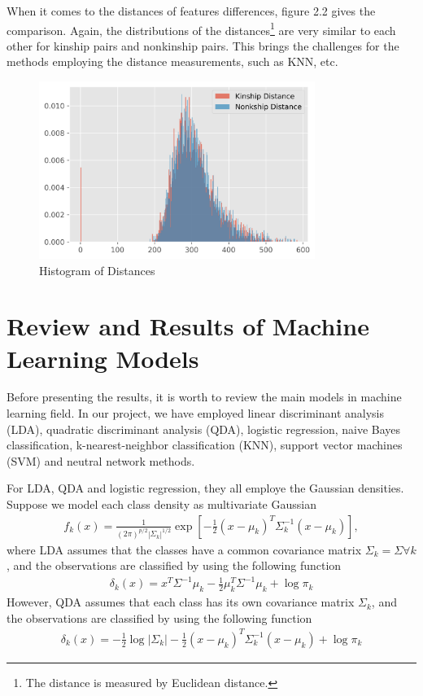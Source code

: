 \documentclass[12pt]{article}
\theoremstyle{definition}
\numberwithin{equation}{section}
\numberwithin{figure}{section}
\numberwithin{table}{section}
\begin{document}
When it comes to the distances of features differences, figure 2.2 gives the comparison. Again, the distributions of the distances\footnote{The distance is measured by Euclidean distance.} are very similar to each other for kinship pairs and nonkinship pairs. This brings the challenges for the methods employing the distance measurements, such as KNN, etc.  
\begin{figure}[!htpb]
	\centering
	\includegraphics[width=0.8\textwidth]{histdistance}
	\caption{Histogram of Distances}
\end{figure}

\section{Review and Results of Machine Learning Models}

Before presenting the results, it is worth to review the main models in machine learning field. In our project, we have employed linear discriminant analysis (LDA), quadratic discriminant analysis (QDA), logistic regression, naive Bayes classification, k-nearest-neighbor classification (KNN), support vector machines (SVM) and neutral network methods. 

For LDA, QDA and logistic regression, they all employe the Gaussian densities. Suppose we model each class density as multivariate Gaussian 
\begin{align}
	f_k(x) = \frac{1}{(2\pi)^{p/2} | \Sigma_k|^{1/2}} \exp[-\frac{1}{2}(x - \mu_k)^T \Sigma_k^{-1}(x-\mu_k)],
\end{align}
where LDA assumes that the classes have a common covariance matrix $\Sigma_k = \Sigma \forall k$, and the observations are classified by using the following function
\begin{align}
	\delta_k(x) = x^T \Sigma^{-1} \mu_k - \frac{1}{2} \mu_k^T \Sigma^{-1} \mu_k + \log \pi_k	
\end{align}
However, QDA assumes that each class has its own covariance matrix $\Sigma_k$, and the observations are classified by using the following function
\begin{align}
	\delta_k(x) = -\frac{1}{2} \log |\Sigma_k| - \frac{1}{2} (x - \mu_k)^T \Sigma_k^{-1} (x - \mu_k) + \log \pi_k
\end{align}
\end{document}
